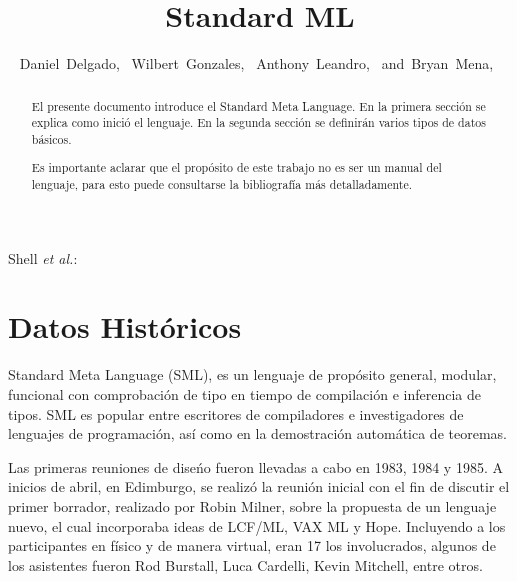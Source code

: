 \documentclass[10pt,journal,compsoc]{IEEEtran}
\begin{document}
\title{Standard ML}
\author{Daniel~Delgado,~
        Wilbert~Gonzales,~
        Anthony~Leandro,~
        and~Bryan~Mena,~
}
{Shell \MakeLowercase{\textit{et al.}}: \LaTex}
\maketitle
\IEEEdisplaynontitleabstractindextext
\IEEEpeerreviewmaketitle
\begin{abstract}
	El presente documento introduce el Standard Meta Language. En la primera secci\'on se explica como inici\'o el lenguaje. En la segunda secci\'on se definir\'an varios tipos de datos b\'asicos.
	
	Es importante aclarar que el prop\'osito de este trabajo no es ser un manual del lenguaje, para esto puede consultarse la bibliograf\'ia m\'as detalladamente.
\end{abstract}

\section{Datos Hist\'oricos}
Standard Meta Language (SML), es un lenguaje de prop\'osito general, modular, funcional con  comprobaci\'on de tipo en tiempo de compilaci\'on e inferencia de tipos. SML es popular entre escritores de compiladores e investigadores de lenguajes de programaci\'on, as\'i como en la demostraci\'on autom\'atica de teoremas.

Las primeras reuniones de dise\'no fueron llevadas a cabo en 1983, 1984 y 1985. A inicios de abril, en Edimburgo, se realiz\'o la reuni\'on inicial con el fin de discutir el primer borrador, realizado por Robin Milner, sobre la propuesta de un lenguaje nuevo, el cual incorporaba ideas de LCF/ML, VAX ML y Hope. Incluyendo a los participantes en f\'isico y de manera virtual, eran 17 los involucrados, algunos de los asistentes fueron Rod Burstall, Luca Cardelli, Kevin Mitchell, entre otros.
\end{document}

